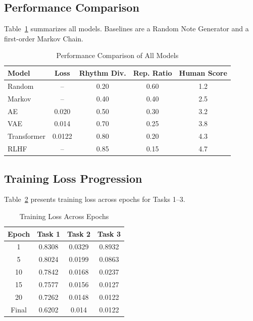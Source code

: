 \documentclass[conference]{IEEEtran}
\begin{document}
\subsection{Performance Comparison}

Table~\ref{tab:results} summarizes all models. Baselines are a Random Note Generator and a first-order Markov Chain.

\begin{table}[htbp]
\caption{Performance Comparison of All Models}
\begin{center}
\begin{tabular}{lcccc}
\toprule
\textbf{Model} & \textbf{Loss} & \textbf{Rhythm Div.} & \textbf{Rep. Ratio} & \textbf{Human Score} \\
\midrule
Random       & --     & 0.20 & 0.60 & 1.2 \\
Markov       & --     & 0.40 & 0.40 & 2.5 \\
AE           & 0.020  & 0.50 & 0.30 & 3.2 \\
VAE          & 0.014  & 0.70 & 0.25 & 3.8 \\
Transformer  & 0.0122 & 0.80 & 0.20 & 4.3 \\
RLHF         & --     & 0.85 & 0.15 & 4.7 \\
\bottomrule
\end{tabular}
\label{tab:results}
\end{center}
\end{table}

\subsection{Training Loss Progression}

Table~\ref{tab:loss} presents training loss across epochs for Tasks 1--3.

\begin{table}[htbp]
\caption{Training Loss Across Epochs}
\begin{center}
\begin{tabular}{|c|c|c|c|}
\hline
\textbf{Epoch} & \textbf{Task 1} & \textbf{Task 2} & \textbf{Task 3} \\
\hline
1     & 0.8308 & 0.0329 & 0.8932 \\
5     & 0.8024   & 0.0199 & 0.0863 \\
10    & 0.7842  & 0.0168 & 0.0237 \\
15    & 0.7577      & 0.0156 & 0.0127 \\
20    & 0.7262     & 0.0148 & 0.0122 \\
Final & 0.6202   & 0.014  & 0.0122 \\
\hline
\end{tabular}
\label{tab:loss}
\end{center}
\end{table}
\end{document}
